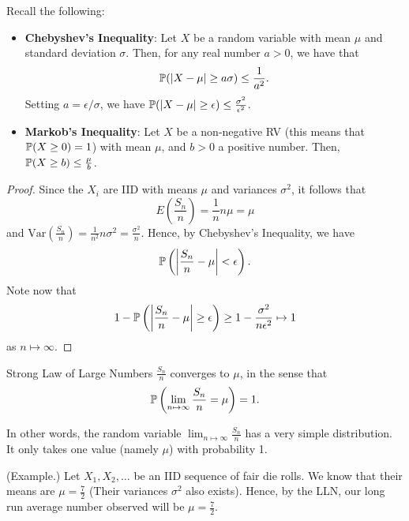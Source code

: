 Recall the following: 
\begin{itemize}
    \item \textbf{Chebyshev's Inequality}: Let $X$ be a random variable with mean $\mu$ and standard deviation $\sigma$. Then, for any real number $a > 0$, we have that 
    \[\mathbb{P}(|X - \mu| \geq a\sigma) \leq \frac{1}{a^2}.\]
    Setting $a = \epsilon / \sigma$, we have $\mathbb{P}(|X - \mu| \geq \epsilon) \leq \frac{\sigma^2}{\epsilon^2}$. 

    \item \textbf{Markob's Inequality}: Let $X$ be a non-negative RV (this means that $\mathbb{P}(X \geq 0) = 1$) with mean $\mu$, and $b > 0$ a positive number. Then, $\mathbb{P}(X \geq b) \leq \frac{\mu}{b}$. 
\end{itemize}
\begin{mdframed}[]
    \begin{proof}
        Since the $X_i$ are IID with means $\mu$ and variances $\sigma^2$, it follows that 
        \[E\left(\frac{S_n}{n}\right) = \frac{1}{n}n\mu = \mu\]
        and $\text{Var}\left(\frac{S_n}{n}\right) = \frac{1}{n^2} n\sigma^2 = \frac{\sigma^2}{n}$. Hence, by Chebyshev's Inequality, we have 
        \[\mathbb{P}\left(\left|\frac{S_n}{n} - \mu \right| < \epsilon\right).\]
        Note now that 
        \[1 - \mathbb{P}\left(\left|\frac{S_n}{n} - \mu\right| \geq \epsilon\right) \geq 1 - \frac{\sigma^2}{n\epsilon^2} \mapsto 1\]
        as $n \mapsto \infty$. 
    \end{proof}
\end{mdframed}

\begin{theorem}{Strong Law of Large Numbers}{}
    $\frac{S_n}{n}$ converges to $\mu$, in the sense that \[\mathbb{P}\left(\lim_{n \mapsto \infty} \frac{S_n}{n} = \mu\right) = 1.\]
\end{theorem}
In other words, the random variable $\lim_{n \mapsto \infty} \frac{S_n}{n}$ has a very simple distribution. It only takes one value (namely $\mu$) with probability 1.


\begin{mdframed}[]
    (Example.) Let $X_1, X_2, \dots$ be an IID sequence of fair die rolls. We know that their means are $\mu = \frac{7}{2}$ (Their variances $\sigma^2$ also exists). Hence, by the LLN, our long run average number observed will be $\mu = \frac{7}{2}$. 
\end{mdframed}

